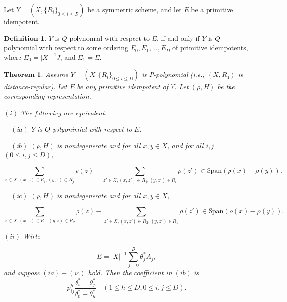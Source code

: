 \documentclass[
]{book}
\newtheorem{theorem}{Theorem}[chapter]
\theoremstyle{definition}
\newtheorem{definition}{Definition}[chapter]
\theoremstyle{definition}
\theoremstyle{definition}
\theoremstyle{definition}
\theoremstyle{remark}
\begin{document}
Let \(Y = (X, \{R_i\}_{0\leq i\leq D})\) be a symmetric scheme, and let \(E\) be a primitive idempotent.

\begin{definition}
\protect\hypertarget{def:q-poly-representation}{}\label{def:q-poly-representation}\(Y\) is \(Q\)-polynomial with respect to \(E\), if and only if \(Y\) is \(Q\)-polynomial with respect to some ordering \(E_0, E_1, \ldots, E_D\) of primitive idempotents, where \(E_0 = |X|^{-1}J\), and \(E_1 = E\).
\end{definition}

\begin{theorem}
\protect\hypertarget{thm:balanced}{}\label{thm:balanced}Assume \(Y = (X, \{R_i\}_{0\leq i\leq D})\) is \(P\)-polynomial (i.e., \((X, R_1)\) is distance-regular). Let \(E\) be any primitive idempotent of \(Y\). Let \((\rho, H)\) be the corresponding representation.

\((i)\) The following are equivalent.

\(\quad (ia)\) \(Y\) is \(Q\)-polyonimial with respect to \(E\).

\(\quad (ib)\) \((\rho, H)\) is nondegenerate and for all \(x,y\in X\), and for all \(i,j\) \((0\leq i,j\leq D)\),

\[\sum_{z\in X, (x,z)\in R_i, (y,z)\in R_j}\rho(z) - \sum_{z'\in X, (x,z')\in R_j, (y,z')\in R_i}\rho(z')\in \mathrm{Span}(\rho(x)-\rho(y)).\]

\(\quad (ic)\) \((\rho, H)\) is nondegenerate and for all \(x,y\in X\),

\[\sum_{z\in X, (x,z)\in R_1, (y,z)\in R_2}\rho(z) - \sum_{z'\in X, (x,z')\in R_2, (y,z')\in R_1}\rho(z')\in \mathrm{Span}(\rho(x)-\rho(y)).\]

\((ii)\) Wirte

\[E = |X|^{-1}\sum_{j=0}^D \theta^*_j A_j,\]
and suppose \((ia)-(ic)\) hold. Then the coefficient in \((ib)\) is
\[p^h_{ij}\frac{\theta_i^*-\theta_j^*}{\theta^*_0-\theta^*_h} \quad (1\leq h\leq D, 0\leq i,j\leq D).\]
\end{theorem}
\end{document}
